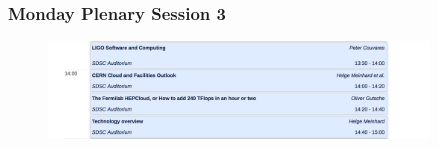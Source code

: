 \begin{frame}
\frametitle{Monday Plenary Session 3}

\begin{figure}[htbp]
\begin{center}
\includegraphics[width=0.9\textwidth]{images/hsf-sdsc-monday3.png}
\end{center}
\end{figure}


\end{frame}


